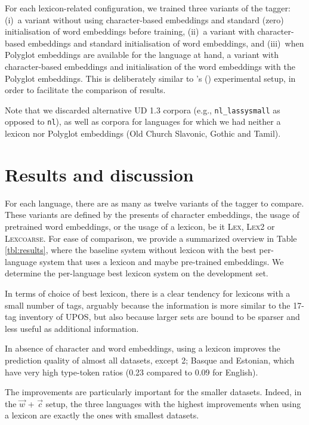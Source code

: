 \documentclass[11pt,letterpaper]{article}
\begin{document}
For each lexicon-related configuration, we trained three variants of the tagger: (i)~a variant without using
character-based embeddings and standard (zero) initialisation of word embeddings before training, (ii)~a variant with
character-based embeddings and standard initialisation of word embeddings, and (iii)~when Polyglot embeddings are
available for the language at hand, a variant with character-based embeddings and initialisation of the word embeddings
with the Polyglot embeddings. This is deliberately similar to \citeauthor{plank16}'s (\citeyear{plank16}) experimental
setup, in order to facilitate the comparison of results.

Note that we discarded alternative UD 1.3 corpora (e.g., {\tt nl\_lassysmall} as opposed to {\tt nl}), as well as
corpora for languages for which we had neither a lexicon nor Polyglot embeddings (Old Church Slavonic, Gothic and Tamil).


\section{Results and discussion}

For each language, there are as many as twelve variants of the tagger to compare. These variants are defined by the presents of character embeddings, the usage of pretrained word embeddings, or the usage of a lexicon, be it \textsc{Lex}, \textsc{Lex2} or \textsc{Lexcoarse}. For ease of comparison, we provide a summarized overview in Table \ref{tbl:results}, where the baseline system without lexicon with the best per-language system that uses a lexicon and maybe pre-trained embeddings. We determine the per-language best lexicon system on the development set.

In terms of choice of best lexicon, there is a clear tendency for lexicons with a small number of tags, arguably because the information is more similar to the 17-tag inventory of UPOS, but also because larger sets are bound to be sparser and less useful as additional information.

In absence of character and word embeddings, using a lexicon improves the prediction quality of almost all datasets, except 2; Basque and Estonian, which have very high type-token ratios (0.23 compared to 0.09 for English).

The improvements are particularly important for the smaller datasets. Indeed, in the $\vec{w}$ + $\vec{c}$ setup, the three languages with the highest improvements when using a lexicon are exactly the ones with smallest datasets.
\end{document}
